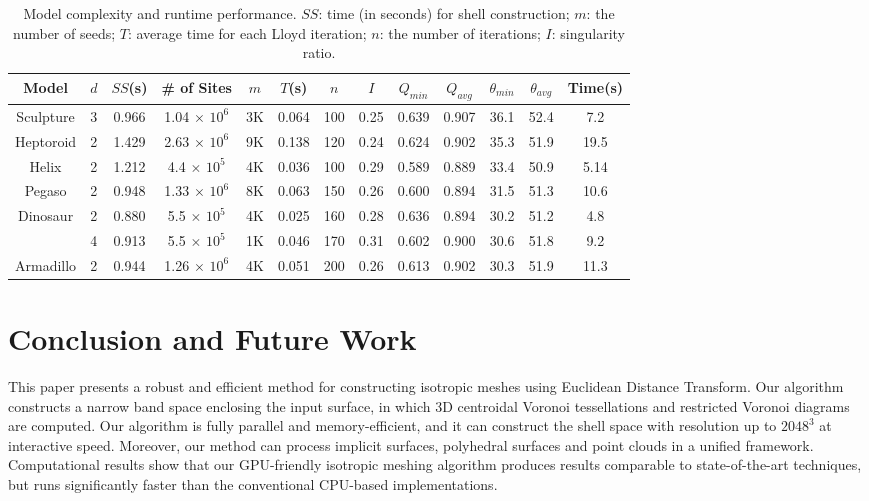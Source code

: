 \begin{table}[tbh]
\caption{Model complexity and runtime performance. $SS$: time (in seconds) for shell construction; $m$: the number of seeds; $T$: average time for each Lloyd iteration; $n$: the number of iterations;
 $I$: singularity ratio. }
\begin{center}
\tabcolsep=0.11cm
\begin{tabular}{ccccccccccccc}
\hline
    Model & $d$ & $SS$(s) & \# of Sites & $m$ & $T$(s) & $n$ & $I$ & $Q_{min}$ & $Q_{avg}$ & $\theta _{min}$ & $\theta _{avg}$ & Time(s)\\
 \hline
    Sculpture    & 3    & 0.966    &   1.04 $\times$ $10^6$  & 3K & 0.064 & 100 & 0.25 & 0.639 & 0.907 & 36.1 & 52.4 & 7.2 \\
    Heptoroid      & 2    & 1.429    &   2.63 $\times$ $10^6$  & 9K & 0.138 & 120 & 0.24 & 0.624 & 0.902 & 35.3 & 51.9 & 19.5 \\
    Helix     & 2    & 1.212    &   4.4 $\times$ $10^5$  & 4K & 0.036 & 100 & 0.29 & 0.589 & 0.889 & 33.4 & 50.9 & 5.14 \\
    Pegaso       & 2    & 0.948    &   1.33 $\times$ $10^6$  & 8K & 0.063 & 150 & 0.26 & 0.600 & 0.894 & 31.5 & 51.3 & 10.6 \\
    Dinosaur     & 2    & 0.880    &   5.5 $\times$ $10^5$  & 4K & 0.025 & 160 & 0.28 & 0.636 & 0.894 & 30.2 & 51.2 & 4.8 \\
                 & 4    & 0.913    &   5.5 $\times$ $10^5$  & 1K & 0.046 & 170 & 0.31 & 0.602 & 0.900 & 30.6 & 51.8 & 9.2 \\
     Armadillo    & 2    & 0.944    &   1.26 $\times$ $10^6$  & 4K & 0.051 & 200 & 0.26 & 0.613 & 0.902 & 30.3 & 51.9 & 11.3\\
 \hline
\end{tabular}
\end{center}
\label{tab:Performancetable}
\end{table}


\vspace{-0.5cm}
\section{Conclusion and Future Work}
\label{sec:conclusion}
  This paper presents a robust and efficient method for constructing isotropic meshes using Euclidean Distance Transform.
  Our algorithm constructs a narrow band space enclosing the input surface, in which 3D centroidal Voronoi tessellations and restricted Voronoi diagrams are computed.
  Our algorithm is fully parallel and memory-efficient,
  and it can construct the shell space with resolution up to $2048^3$ at interactive speed.
  Moreover, our method can process implicit surfaces, polyhedral surfaces and point clouds in a unified framework.
  Computational results show that our GPU-friendly isotropic meshing algorithm produces results comparable to state-of-the-art techniques,
  but runs significantly faster than the conventional CPU-based implementations.

